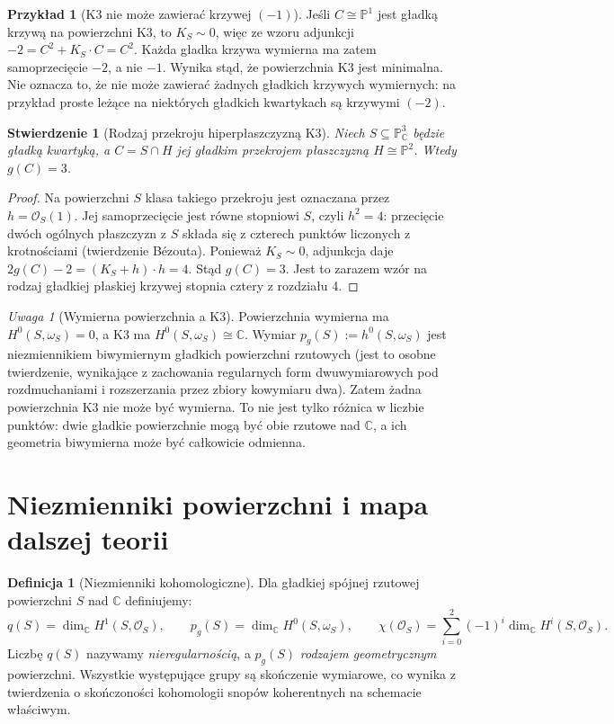\documentclass[11pt,a4paper,openany]{report}
\numberwithin{equation}{section}
\theoremstyle{plain}
\newtheorem{stwierdzenie}[twierdzenie]{Stwierdzenie}
\theoremstyle{definition}
\newtheorem{definicja}[twierdzenie]{Definicja}
\newtheorem{przyklad}[twierdzenie]{Przykład}
\theoremstyle{remark}
\newtheorem{uwaga}[twierdzenie]{Uwaga}
\newcommand{\C}{\mathbb C}
\newcommand{\PP}{\mathbb P}
\begin{document}
\begin{przyklad}[K3 nie może zawierać krzywej $(-1)$]
\label{prz:ga6-k3-no-minus1}
Jeśli $C\cong\PP^1$ jest gładką krzywą na powierzchni K3,
to $K_S\sim0$, więc ze wzoru adjunkcji
$-2=C^2+K_S\cdot C=C^2$.
Każda gładka krzywa wymierna ma zatem
samoprzecięcie $-2$, a nie $-1$. Wynika stąd,
że powierzchnia K3 jest minimalna. Nie oznacza to,
że nie może zawierać żadnych gładkich krzywych
wymiernych: na przykład proste leżące na niektórych
gładkich kwartykach są krzywymi $(-2)$.
\end{przyklad}

\begin{stwierdzenie}[Rodzaj przekroju hiperpłaszczyzną K3]
\label{st:ga6-quartic-plane-section}
Niech $S\subseteq\PP^3_\C$ będzie gładką kwartyką,
a $C=S\cap H$ jej gładkim przekrojem płaszczyzną
$H\cong\PP^2$. Wtedy $g(C)=3$.
\end{stwierdzenie}
\begin{proof}
Na powierzchni $S$ klasa takiego przekroju
jest oznaczana przez $h=\mathcal O_S(1)$.
Jej samoprzecięcie jest równe stopniowi $S$,
czyli $h^2=4$: przecięcie dwóch ogólnych
płaszczyzn z $S$ składa się z czterech punktów
liczonych z krotnościami (twierdzenie Bézouta).
Ponieważ $K_S\sim0$, adjunkcja daje
$2g(C)-2=(K_S+h)\cdot h=4$.
Stąd $g(C)=3$. Jest to zarazem wzór na rodzaj
gładkiej płaskiej krzywej stopnia cztery z rozdziału 4.
\end{proof}

\begin{uwaga}[Wymierna powierzchnia a K3]
Powierzchnia wymierna ma $H^0(S,\omega_S)=0$,
a K3 ma $H^0(S,\omega_S)\cong\C$.
Wymiar $p_g(S):=h^0(S,\omega_S)$ jest
niezmiennikiem biwymiernym gładkich powierzchni
rzutowych (jest to osobne twierdzenie, wynikające
z zachowania regularnych form dwuwymiarowych
pod rozdmuchaniami i rozszerzania przez zbiory
kowymiaru dwa). Zatem żadna powierzchnia K3
nie może być wymierna.
To nie jest tylko różnica w liczbie punktów:
dwie gładkie powierzchnie mogą być obie rzutowe
nad $\C$, a ich geometria biwymierna może być
całkowicie odmienna.
\end{uwaga}

\section{Niezmienniki powierzchni i mapa dalszej teorii}
\label{sec:ga6-invariants}

\begin{definicja}[Niezmienniki kohomologiczne]
Dla gładkiej spójnej rzutowej powierzchni $S$ nad
$\C$ definiujemy:
\[
 q(S)=\dim_{\C}H^1(S,\mathcal O_S),\qquad
 p_g(S)=\dim_{\C}H^0(S,\omega_S),\qquad
 \chi(\mathcal O_S)=\sum_{i=0}^2(-1)^i
 \dim_{\C}H^i(S,\mathcal O_S).
\]
Liczbę $q(S)$ nazywamy \emph{nieregularnością},
a $p_g(S)$ \emph{rodzajem geometrycznym} powierzchni.
Wszystkie występujące grupy są skończenie wymiarowe,
co wynika z twierdzenia o skończoności kohomologii
snopów koherentnych na schemacie właściwym.
\end{definicja}
\end{document}
